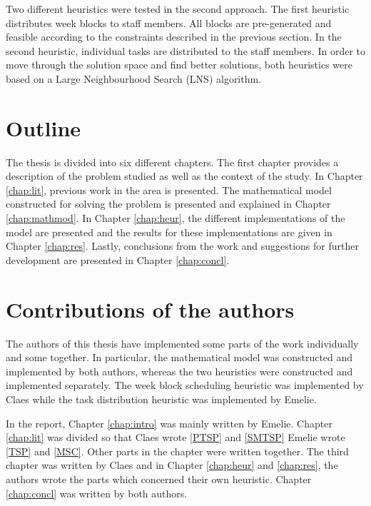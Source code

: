 Two different heuristics were tested in the second approach. The first heuristic distributes week blocks to staff members. All blocks are pre-generated and feasible according to the constraints described in the previous section. In the second heuristic, individual tasks are distributed to the staff members. In order to move through the solution space and find better solutions, both heuristics were based on a Large Neighbourhood Search (LNS) algorithm.

\section{Outline}

The thesis is divided into six different chapters. The first chapter provides a description of the problem studied as well as the context of the study. In Chapter \ref{chap:lit}, previous work in the area is presented. The mathematical model constructed for solving the problem is presented and explained in Chapter \ref{chap:mathmod}. In Chapter \ref{chap:heur}, the different implementations of the model are presented and the results for these implementations are given in Chapter \ref{chap:res}. Lastly, conclusions from the work and suggestions for further development are presented in Chapter \ref{chap:concl}.

\section{Contributions of the authors}

The authors of this thesis have implemented some parts of the work individually and some together. In particular, the mathematical model was constructed and implemented by both authors, whereas the two heuristics were constructed and implemented separately. The week block scheduling heuristic was implemented by Claes while the task distribution heuristic was implemented by Emelie.

In the report, Chapter \ref{chap:intro} was mainly written by Emelie. Chapter \ref{chap:lit} was divided so that Claes wrote \ref{PTSP} and \ref{SMTSP} Emelie wrote \ref{TSP} and \ref{MSC}. Other parts in the chapter were written together. The third chapter was written by Claes and in Chapter \ref{chap:heur} and \ref{chap:res}, the authors wrote the parts which concerned their own heuristic. Chapter \ref{chap:concl} was written by both authors.
 

